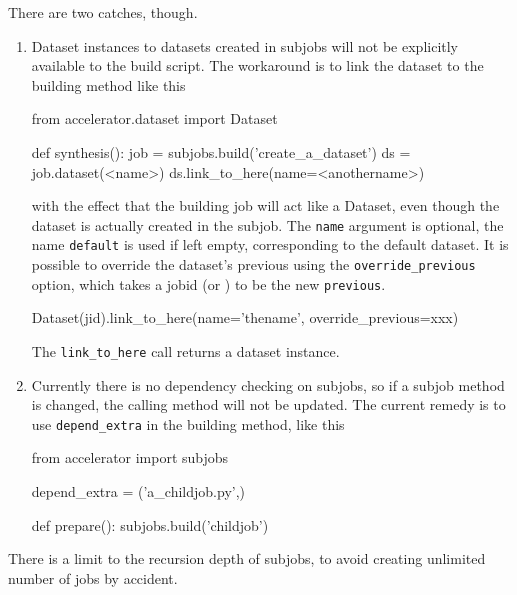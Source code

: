 There are two catches, though.
\begin{enumerate}
\item
Dataset instances to datasets created in subjobs will not be
explicitly available to the build script.  The workaround is to link
the dataset to the building method like this
\begin{python}
from accelerator.dataset import Dataset

def synthesis():
    job = subjobs.build('create_a_dataset')
    ds = job.dataset(<name>)
    ds.link_to_here(name=<anothername>)
\end{python}
with the effect that the building job will act like a Dataset, even
though the dataset is actually created in the subjob.  The
\texttt{name} argument is optional, the name \texttt{default} is used
if left empty, corresponding to the default dataset.  It is possible
to override the dataset's previous using
the \texttt{override\_previous} option, which takes a jobid
(or \pyNone) to be the new \texttt{previous}.
\begin{python}
Dataset(jid).link_to_here(name='thename', override_previous=xxx)
\end{python}
The \texttt{link\_to\_here} call returns a dataset instance.

\item
Currently there is no dependency checking on subjobs, so if a subjob
method is changed, the calling method will not be updated.  The
current remedy is to use \texttt{depend\_extra} in the building
method, like this
\begin{python}
from accelerator import subjobs

depend_extra = ('a_childjob.py',)

def prepare():
    subjobs.build('childjob')
\end{python}
\end{enumerate}
There is a limit to the recursion depth of subjobs, to avoid creating
unlimited number of jobs by accident.





